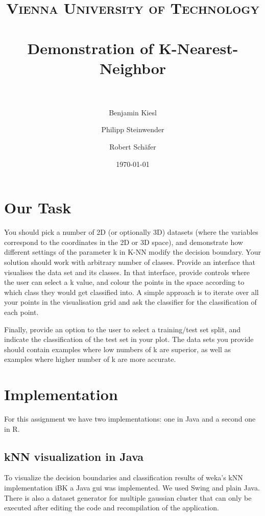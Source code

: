 \documentclass[paper=a4, fontsize=11pt]{scrartcl} %
\title{	
\normalfont \normalsize 
\textsc{Vienna University of Technology} \\ [25pt] %
\horrule{0.5pt} \\[0.4cm] %
\huge Demonstration of K-Nearest-Neighbor \\ %
\horrule{2pt} \\[0.5cm] %
}
\author{Benjamin Kiesl \and Philipp Steinwender \and Robert Sch\"{a}fer} %
\date{\normalsize\today} %
\numberwithin{equation}{section} %
\numberwithin{figure}{section} %
\numberwithin{table}{section} %
\begin{document}
\maketitle %


\section{Our Task}

You should pick a number of 2D (or optionally 3D) datasets (where the variables correspond to the coordinates in the 2D or 3D space), and demonstrate how different settings of the parameter k in K-NN modify the decision boundary. Your solution should work with arbitrary number of classes.
Provide an interface that visualises the data set and its classes. In that interface, provide controls where the user can select a k value, and colour the points in the space according to which class they would get classified into. A simple approach is to iterate over all your points in the visualisation grid and ask the classifier for the classification of each point.

Finally, provide an option to the user to select a training/test set split, and indicate the classification of the test set in your plot.
The data sets you provide should contain examples where low numbers of k are superior, as well as examples where higher number of k are more accurate.

\section{Implementation}

For this assignment we have two implementations: one in Java and a second one in R.

\subsection{kNN visualization in Java}

To visualize the decision boundaries and  classification results of weka's kNN implementation iBK a Java gui was implemented. We used Swing and plain Java. There is also a dataset generator for multiple gaussian cluster that can only be executed after editing the code and recompilation of the application.
\end{document}

